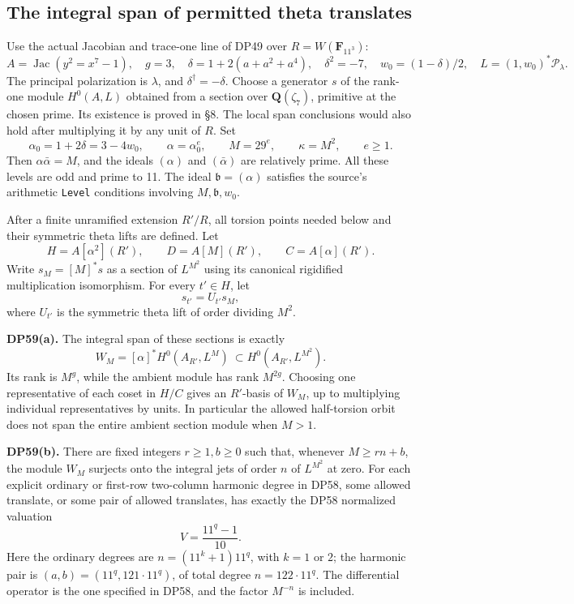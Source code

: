 \subsection{The integral span of permitted theta translates}

\begin{theorem}\label{DP59}
Use the actual Jacobian and trace-one line of DP49 over \(R=W(\mathbf F_{11^3})\): \[
 A=\operatorname{Jac}(y^2=x^7-1),\quad g=3,\quad
 \delta=1+2(a+a^2+a^4),\quad \delta^2=-7,\quad
 w_0=(1-\delta)/2,\quad
 L=(1,w_0)^*\mathcal P_\lambda.
\] The principal polarization is \(\lambda\), and \(\delta^\dagger=-\delta\). Choose a generator \(s\) of the rank-one module \(H^0(A,L)\) obtained from a section over \(\mathbf Q(\zeta_7)\), primitive at the chosen prime. Its existence is proved in §8. The local span conclusions would also hold after multiplying it by any unit of \(R\). Set \[
 \alpha_0=1+2\delta=3-4w_0,\qquad
 \alpha=\alpha_0^e,\qquad M=29^e,\qquad \kappa=M^2,
 \qquad e\ge1.
 \tag{TS1}
\] Then \(\alpha\bar\alpha=M\), and the ideals \((\alpha)\) and \((\bar\alpha)\) are relatively prime. All these levels are odd and prime to 11. The ideal \(\mathfrak b=(\alpha)\) satisfies the source's arithmetic \texttt{Level} conditions involving \(M,\mathfrak b,w_0\).

After a finite unramified extension \(R'/R\), all torsion points needed below and their symmetric theta lifts are defined. Let \[
 H=A[\alpha^2](R'),\qquad D=A[M](R'),\qquad C=A[\alpha](R').
 \tag{TS2}
\] Write \(s_M=[M]^*s\) as a section of \(L^{M^2}\) using its canonical rigidified multiplication isomorphism. For every \(t'\in H\), let \[
 s_{t'}=U_{t'}s_M,
 \tag{TS3}
\] where \(U_{t'}\) is the symmetric theta lift of order dividing \(M^2\).

\textbf{DP59(a).} The integral span of these sections is exactly \[
 W_M=[\alpha]^*H^0(A_{R'},L^M)
       \ \subset H^0(A_{R'},L^{M^2}).
 \tag{TS4}
\] Its rank is \(M^g\), while the ambient module has rank \(M^{2g}\). Choosing one representative of each coset in \(H/C\) gives an \(R'\)-basis of \(W_M\), up to multiplying individual representatives by units. In particular the allowed half-torsion orbit does not span the entire ambient section module when \(M>1\).

\textbf{DP59(b).} There are fixed integers \(r\ge1,b\ge0\) such that, whenever \(M\ge rn+b\), the module \(W_M\) surjects onto the integral jets of order \(n\) of \(L^{M^2}\) at zero. For each explicit ordinary or first-row two-column harmonic degree in DP58, some allowed translate, or some pair of allowed translates, has exactly the DP58 normalized valuation \[
 V=\frac{11^q-1}{10}.
 \tag{TS5}
\] Here the ordinary degrees are \(n=(11^k+1)11^q\), with \(k=1\) or \(2\); the harmonic pair is \((a,b)=(11^q,121\cdot11^q)\), of total degree \(n=122\cdot11^q\). The differential operator is the one specified in DP58, and the factor \(M^{-n}\) is included.


\end{theorem}
